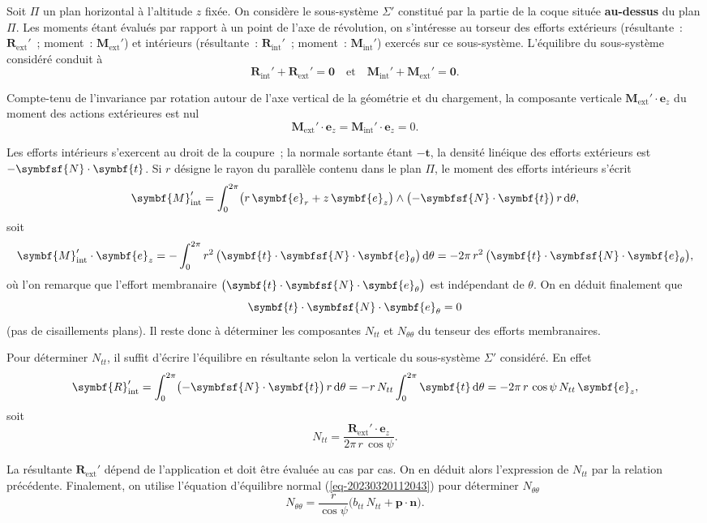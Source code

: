 \documentclass[
  a4paper,
  DIV=11,
  numbers=noendperiod]{scrreprt}
\newcommand{\D}{{\mathrm d}}
\newcommand{\external}{\mathrm{ext}}
\newcommand{\internal}{\mathrm{int}}
\newcommand{\tens}[1]{\symbfsf{#1}}
\renewcommand{\vec}[1]{\symbf{#1}}
\begin{document}
Soit \(\Pi\) un plan horizontal à l'altitude \(z\) fixée. On considère
le sous-système \(\Sigma'\) constitué par la partie de la coque située
\textbf{au-dessus} du plan \(\Pi\). Les moments étant évalués par
rapport à un point de l'axe de révolution, on s'intéresse au torseur des
efforts extérieurs (résultante~: \(\vec{R}_\external'\)~; moment~:
\(\vec{M}_\external'\)) et intérieurs (résultante~:
\(\vec{R}_\internal'\)~; moment~: \(\vec{M}_\internal'\)) exercés sur ce
sous-système. L'équilibre du sous-système considéré conduit à \[
\vec{R}_\internal' + \vec{R}_\external' = \vec{0}
\quad \text{et} \quad
\vec{M}_\internal' + \vec{M}_\external' = \vec{0}.
\]

Compte-tenu de l'invariance par rotation autour de l'axe vertical de la
géométrie et du chargement, la composante verticale
\(\vec{M}_\external' \cdot \vec{e}_z\) du moment des actions extérieures
est nul \[
\vec{M}_\external' \cdot \vec{e}_z = \vec{M}_\internal' \cdot \vec{e}_z = 0.
\]

Les efforts intérieurs s'exercent au droit de la coupure~; la normale
sortante étant \(-\vec{t}\), la densité linéique des efforts extérieurs
est \(-\tens{N} \cdot \vec{t}\). Si \(r\) désigne le rayon du parallèle
contenu dans le plan \(\Pi\), le moment des efforts intérieurs s'écrit
\[
\vec{M}_\internal' = \int_0^{2\pi} \bigl(r \, \vec{e}_r + z \, \vec{e}_z \bigr) \wedge \bigl( -\tens{N} \cdot \vec{t} \bigr) \, r \, \D \theta,
\] soit \[
\vec{M}_\internal' \cdot \vec{e}_z = -\int_0^{2\pi} r^2 \, \bigl( \vec{t} \cdot \tens{N} \cdot \vec{e}_\theta \bigr) \, \D \theta = -2\pi \, r^2 \, \bigl( \vec{t} \cdot \tens{N} \cdot \vec{e}_\theta \bigr),
\] où l'on remarque que l'effort membranaire
\(\bigl( \vec{t} \cdot \tens{N} \cdot \vec{e}_\theta \bigr)\) est
indépendant de \(\theta\). On en déduit finalement que \[
\vec{t} \cdot \tens{N} \cdot \vec{e}_\theta = 0
\] (pas de cisaillements plans). Il reste donc à déterminer les
composantes \(N_{tt}\) et \(N_{\theta\theta}\) du tenseur des efforts
membranaires.

Pour déterminer \(N_{tt}\), il suffit d'écrire l'équilibre en résultante
selon la verticale du sous-système \(\Sigma'\) considéré. En effet \[
\vec{R}_\internal' = \int_{0}^{2\pi} \bigl( -\tens{N} \cdot \vec{t} \bigr) \, r \, \D \theta = -r \, N_{tt} \int_{0}^{2\pi} \vec{t} \, \D \theta = -2\pi \, r \, \cos \psi \, N_{tt} \, \vec{e}_z,
\] soit \[
N_{tt} = \frac{\vec{R}_\external' \cdot \vec{e}_z}{2\pi \, r \, \cos \psi}.
\]

La résultante \(\vec{R}_\external'\) dépend de l'application et doit
être évaluée au cas par cas. On en déduit alors l'expression de
\(N_{tt}\) par la relation précédente. Finalement, on utilise l'équation
d'équilibre normal (\ref{eq-20230320112043}) pour déterminer
\(N_{\theta\theta}\) \[
N_{\theta\theta} = \frac{r}{\cos \psi} \bigl( b_{tt} \, N_{tt} + \vec{p} \cdot \vec{n} \bigr).
\]
\end{document}
